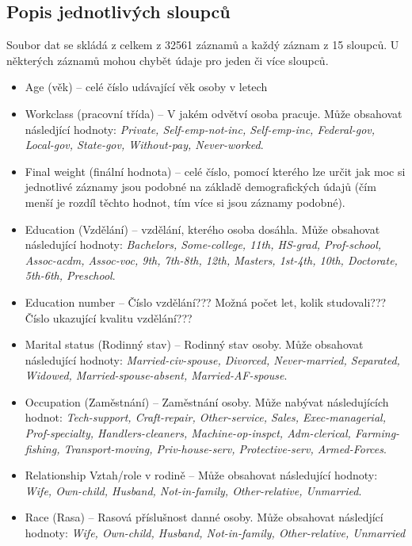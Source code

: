 \documentclass[11pt,a4paper,titlepage]{article}
\begin{document}
        \subsection{Popis jednotlivých sloupců}
            Soubor dat se skládá z celkem z 32561 záznamů a každý záznam z 15 sloupců. U některých záznamů mohou chybět údaje pro jeden či více sloupců.
            \begin{itemize}
                \item Age (věk) -- celé číslo udávající věk osoby v letech
                \item Workclass (pracovní třída) -- V jakém odvětví osoba pracuje. Může obsahovat následjící hodnoty: \textit{Private, Self-emp-not-inc, Self-emp-inc, Federal-gov, Local-gov, State-gov, Without-pay, Never-worked}.
                \item Final weight (finální hodnota) -- celé číslo, pomocí kterého lze určit jak moc si jednotlivé záznamy jsou podobné na základě demografických údajů (čím menší je rozdíl těchto hodnot, tím více si jsou záznamy podobné).
                \item Education (Vzdělání) -- vzdělání, kterého osoba dosáhla. Může obsahovat následující hodnoty: \textit{Bachelors, Some-college, 11th, HS-grad, Prof-school, Assoc-acdm, Assoc-voc, 9th, 7th-8th, 12th, Masters, 1st-4th, 10th, Doctorate, 5th-6th, Preschool}.
                \item Education number -- Číslo vzdělání??? Možná počet let, kolik studovali??? Číslo ukazující kvalitu vzdělání???
                \item Marital status (Rodinný stav) -- Rodinný stav osoby. Může obsahovat následující hodnoty: \textit{Married-civ-spouse, Divorced, Never-married, Separated, Widowed, Married-spouse-absent, Married-AF-spouse}.
                \item Occupation (Zaměstnání) -- Zaměstnání osoby. Může nabývat následujících hodnot: \textit{Tech-support, Craft-repair, Other-service, Sales, Exec-managerial, Prof-specialty, Handlers-cleaners, Machine-op-inspct, Adm-clerical, Farming-fishing, Transport-moving, Priv-house-serv, Protective-serv, Armed-Forces}.
                \item Relationship Vztah/role v rodině -- Může obsahovat následující hodnoty: \textit{Wife, Own-child, Husband, Not-in-family, Other-relative, Unmarried}.
                \item Race (Rasa) -- Rasová příslušnost danné osoby. Může obsahovat následjící hodnoty: \textit{Wife, Own-child, Husband, Not-in-family, Other-relative, Unmarried}

\end{itemize}
\end{document}
